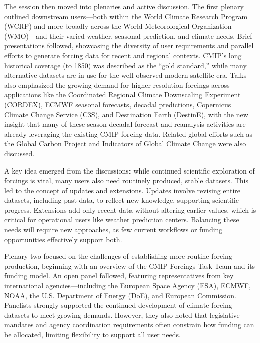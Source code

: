 \documentclass{ametsocV6.1}
\begin{document}
The session then moved into plenaries and active discussion. The first plenary outlined downstream users—both within the World Climate Research Program (WCRP) and more broadly across the World Meteorological Organization (WMO)—and their varied weather, seasonal prediction, and climate needs. Brief presentations followed, showcasing the diversity of user requirements and parallel efforts to generate forcing data for recent and regional contexts. CMIP’s long historical coverage (to 1850) was described as the ``gold standard,'' while many alternative datasets are in use for the well-observed modern satellite era. Talks also emphasized the growing demand for higher-resolution forcings across applications like the Coordinated Regional Climate Downscaling Experiment (CORDEX), ECMWF seasonal forecasts, decadal predictions, Copernicus Climate Change Service (C3S), and Destination Earth (DestinE), with the new insight that many of these season-decadal forecast and reanalysis activities are already leveraging the existing CMIP forcing data. Related global efforts such as the Global Carbon Project \citep{friedlingstein_global_2024} and Indicators of Global Climate Change \citep{forster_indicators_2024} were also discussed.

A key idea emerged from the discussions: while continued scientific exploration of forcings is vital, many users also need routinely produced, stable datasets. This led to the concept of updates and extensions. Updates involve revising entire datasets, including past data, to reflect new knowledge, supporting scientific progress. Extensions add only recent data without altering earlier values, which is critical for operational users like weather prediction centers. Balancing these needs will require new approaches, as few current workflows or funding opportunities effectively support both.

Plenary two focused on the challenges of establishing more routine forcing production, beginning with an overview of the CMIP Forcings Task Team and its funding model. An open panel followed, featuring representatives from key international agencies—including the European Space Agency (ESA), ECMWF, NOAA, the U.S. Department of Energy (DoE), and European Commission. Panelists strongly supported the continued development of climate forcing datasets to meet growing demands. However, they also noted that legislative mandates and agency coordination requirements often constrain how funding can be allocated, limiting flexibility to support all user needs.
\end{document}
